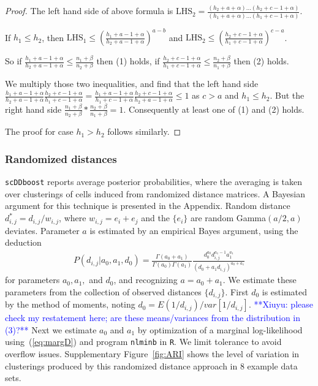 \documentclass[aoas,preprint]{imsart}
\begin{document}
\begin{proof}
 The left hand side of above formula is $\text{LHS}_2 = \frac{(h_2 + a + \alpha)...(h_2 + c - 1 + \alpha)}{(h_1 + a + \alpha) ... (h_1 + c - 1 + \alpha)}$.

If $h_1 \leq h_2$, then $\text{LHS}_1 \leq (\frac{h_1 + a - 1 + \alpha}{h_2 + a  - 1 + \alpha})^{a - b}$ and $\text{LHS}_2 \leq (\frac{h_2 + c - 1 + \alpha}{h_1 + c  - 1 + \alpha})^{c - a}$.

So if $\frac{h_1 + a - 1 + \alpha}{h_2 + a  - 1 + \alpha} \leq \frac{n_1 + \beta}{n_2 + \beta} $ then (1) holds, if $\frac{h_2 + c - 1 + \alpha}{h_1 + c  - 1 + \alpha} \leq \frac{n_2 + \beta}{n_1 + \beta}$ then (2) holds.

We multiply those two inequalities, and find that the left hand side $\frac{h_1 + a - 1 + \alpha}{h_2 + a  - 1 + \alpha}  \frac{h_2 + c - 1 + \alpha}{h_1 + c  - 1 + \alpha} = \frac{h_1 + a - 1 + \alpha}{h_1 + c  - 1 + \alpha}  \frac{h_2 + c - 1 + \alpha}{h_2 + a  - 1 + \alpha} \leq 1$ as $c > a$ and $h_1 \leq h_2$. But the right hand side $\frac{n_1 + \beta}{n_2 + \beta} * \frac{n_2 + \beta}{n_1 + \beta} = 1$. Consequently at least one of (1) and (2) holds.

The proof for case $h_1 > h_2$ follows similarly.




\end{proof}




\subsubsection*{Randomized distances}

\texttt{scDDboost} reports average posterior probabilities, where the averaging is taken over
 clusterings of cells induced from randomized distance matrices.  A Bayesian argument for this 
technique is presented in the Appendix.  Random distance $d^*_{i,j} = d_{i,j}/w_{i,j}$, where
$w_{i,j}=e_i + e_j$ and the $\{e_i\}$ are random Gamma$( a/2,  a )$ deviates.   Parameter $a$
is estimated by an empirical Bayes argument, using the deduction 
\begin{eqnarray}
\label{eq:margD}
P(d_{i,j} | a_0, a_1, d_0) = \frac{\Gamma(a_0 + a_1)}{\Gamma(a_0)\Gamma(a_1)} \frac{d_0^{a_0} d_{i,j}^{a_1 - 1}a_1^{a_1}}{(d_0 + a_1  d_{i,j})^{a_0 + a_1}}
\end{eqnarray}
for parameters $a_0, a_1, $ and $d_0$, and recognizing $a = a_0+a_1$.  We estimate these parameters
from the collection of observed distances $\{ d_{i,j} \}$.  First $d_0$ is estimated by the method
of moments, noting $d_0=E( 1/d_{i,j} )/var[ 1/d_{i,j} ]$. 
\textcolor{blue}{**Xiuyu: please check my restatement here; are these means/variances from the 
distribution in (3)?**} Next we estimate $a_0$ and $a_1$ by 
optimization of a marginal log-likelihood using~(\ref{eq:margD}) and program \verb+nlminb+ in \verb+R+.
We limit tolerance to avoid overflow issues. Supplementary Figure~\ref{fig:ARI} shows the level of 
variation in clusterings produced by this randomized distance approach in 8 example data sets.
\end{document}
